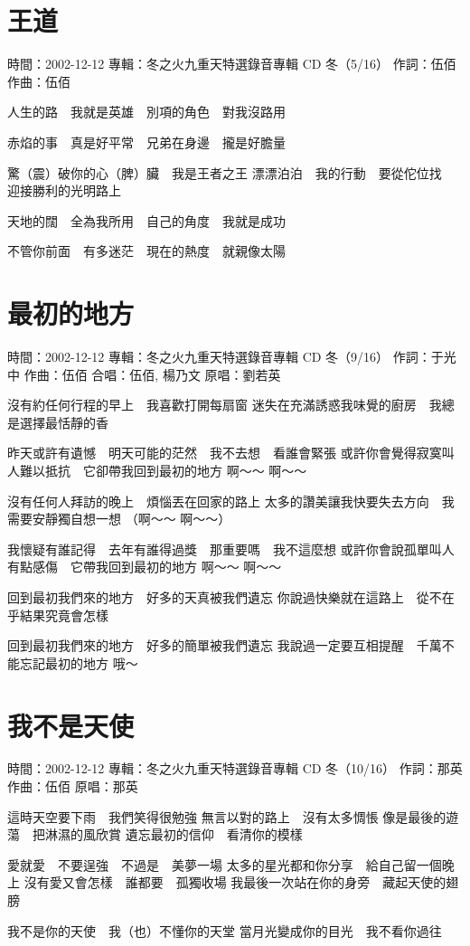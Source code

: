 \documentclass[UTF8,a4paper,oneside,twocolumn,12pt]{ctexbook}
\newcommand{\infopair}[2]{\textbullet #1：#2}
\newcommand{\zc}[1][伍佰]{\infopair{作詞}{#1}}
\newcommand{\zq}[1][伍佰]{\infopair{作曲}{#1}}
\newcommand{\zj}[1]{\infopair{專輯}{#1}}
\newcommand{\yc}[1]{\infopair{原唱}{#1}}
\newcommand{\sj}[1]{\infopair{時間}{#1}}
\newenvironment{info}{\begin{flushleft}\kaishu
	}
	{\end{flushleft}\normalsize\yahei\par}
\newenvironment{lyric}{
	}
{}
\begin{document}
\section{王道}
\begin{info}
	\sj{2002-12-12}
	\zj{冬之火九重天特選錄音專輯 CD 冬（5/16）}
	\zc
	\zq
\end{info}
\begin{lyric}
	人生的路　我就是英雄　別項的角色　對我沒路用

	赤焰的事　真是好平常　兄弟在身邊　攏是好膽量

	驚（震）破你的心（脾）臟　我是王者之王
	漂漂泊泊　我的行動　要從佗位找　迎接勝利的光明路上

	天地的闊　全為我所用　自己的角度　我就是成功

	不管你前面　有多迷茫　現在的熱度　就親像太陽
\end{lyric}

\section{最初的地方}
\begin{info}
	\sj{2002-12-12}
	\zj{冬之火九重天特選錄音專輯 CD 冬（9/16）}
	\zc[于光中]
	\zq
	\infopair{合唱}{伍佰, 楊乃文}
	\yc{劉若英}
\end{info}
\begin{lyric}
	沒有約任何行程的早上　我喜歡打開每扇窗
	迷失在充滿誘惑我味覺的廚房　我總是選擇最恬靜的香

	昨天或許有遺憾　明天可能的茫然　我不去想　看誰會緊張
	或許你會覺得寂寞叫人難以抵抗　它卻帶我回到最初的地方
	啊～～ 啊～～

	沒有任何人拜訪的晚上　煩惱丟在回家的路上
	太多的讚美讓我快要失去方向　我需要安靜獨自想一想
	（啊～～ 啊～～）

	我懷疑有誰記得　去年有誰得過獎　那重要嗎　我不這麼想
	或許你會說孤單叫人有點感傷　它帶我回到最初的地方
	啊～～ 啊～～

	回到最初我們來的地方　好多的天真被我們遺忘
	你說過快樂就在這路上　從不在乎結果究竟會怎樣

	回到最初我們來的地方　好多的簡單被我們遺忘
	我說過一定要互相提醒　千萬不能忘記最初的地方
	哦～
\end{lyric}

\section{我不是天使}
\begin{info}
	\sj{2002-12-12}
	\zj{冬之火九重天特選錄音專輯 CD 冬（10/16）}
	\zc[那英]
	\zq
	\yc{那英}
\end{info}
\begin{lyric}
	這時天空要下雨　我們笑得很勉強
	無言以對的路上　沒有太多惆悵
	像是最後的遊蕩　把淋濕的風欣賞
	遺忘最初的信仰　看清你的模樣

	愛就愛　不要逞強　不過是　美夢一場
	太多的星光都和你分享　給自己留一個晚上
	沒有愛又會怎樣　誰都要　孤獨收場
	我最後一次站在你的身旁　藏起天使的翅膀

	我不是你的天使　我（也）不懂你的天堂
	當月光變成你的目光　我不看你過往
\end{lyric}
\end{document}
